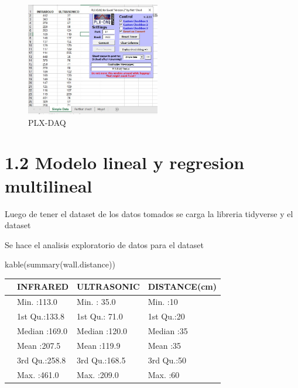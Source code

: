 \documentclass[
]{article}
\newenvironment{Shaded}{\begin{snugshade}}{\end{snugshade}}
\newcommand{\FunctionTok}[1]{\textcolor[rgb]{0.00,0.00,0.00}{#1}}
\newcommand{\NormalTok}[1]{#1}
\newcommand{\OtherTok}[1]{\textcolor[rgb]{0.56,0.35,0.01}{#1}}
\newcommand{\SpecialCharTok}[1]{\textcolor[rgb]{0.00,0.00,0.00}{#1}}
\newcommand{\StringTok}[1]{\textcolor[rgb]{0.31,0.60,0.02}{#1}}
\begin{document}
\begin{figure}
\centering
\includegraphics[width=2.30208in,height=\textheight]{plx.png}
\caption{PLX-DAQ}
\end{figure}

\hypertarget{modelo-lineal-y-regresion-multilineal}{%
\section{1.2 Modelo lineal y regresion
multilineal}\label{modelo-lineal-y-regresion-multilineal}}

Luego de tener el dataset de los datos tomados se carga la libreria
tidyverse y el dataset

\begin{Shaded}
\end{Shaded}

Se hace el analisis exploratorio de datos para el dataset

\begin{Shaded}
\begin{Highlighting}[]
\FunctionTok{kable}\NormalTok{(}\FunctionTok{summary}\NormalTok{(wall.distance))}
\end{Highlighting}
\end{Shaded}

\begin{longtable}[]{@{}llll@{}}
\toprule()
& INFRARED & ULTRASONIC & DISTANCE(cm) \\
\midrule()
\endhead
& Min. :113.0 & Min. : 35.0 & Min. :10 \\
& 1st Qu.:133.8 & 1st Qu.: 71.0 & 1st Qu.:20 \\
& Median :169.0 & Median :120.0 & Median :35 \\
& Mean :207.5 & Mean :119.9 & Mean :35 \\
& 3rd Qu.:258.8 & 3rd Qu.:168.5 & 3rd Qu.:50 \\
& Max. :461.0 & Max. :209.0 & Max. :60 \\
\bottomrule()
\end{longtable}
\end{document}
